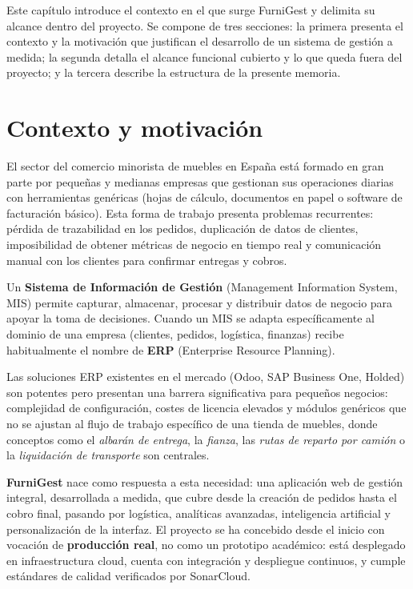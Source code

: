 \documentclass[12pt,twoside,titlepage]{report}
\begin{document}
Este capítulo introduce el contexto en el que surge FurniGest y delimita su alcance dentro del proyecto. Se compone de tres secciones: la primera presenta el contexto y la motivación que justifican el desarrollo de un sistema de gestión a medida; la segunda detalla el alcance funcional cubierto y lo que queda fuera del proyecto; y la tercera describe la estructura de la presente memoria.

\section{Contexto y motivación}

El sector del comercio minorista de muebles en España está formado en gran parte por pequeñas y medianas empresas que gestionan sus operaciones diarias con herramientas genéricas (hojas de cálculo, documentos en papel o software de facturación básico). Esta forma de trabajo presenta problemas recurrentes: pérdida de trazabilidad en los pedidos, duplicación de datos de clientes, imposibilidad de obtener métricas de negocio en tiempo real y comunicación manual con los clientes para confirmar entregas y cobros.

Un \textbf{Sistema de Información de Gestión} (Management Information System, MIS) \cite{pressman} permite capturar, almacenar, procesar y distribuir datos de negocio para apoyar la toma de decisiones. Cuando un MIS se adapta específicamente al dominio de una empresa (clientes, pedidos, logística, finanzas) recibe habitualmente el nombre de \textbf{ERP} (Enterprise Resource Planning).


Las soluciones ERP existentes en el mercado (Odoo, SAP Business One, Holded) son potentes pero presentan una barrera significativa para pequeños negocios: complejidad de configuración, costes de licencia elevados y módulos genéricos que no se ajustan al flujo de trabajo específico de una tienda de muebles, donde conceptos como el \emph{albarán de entrega}, la \emph{fianza}, las \emph{rutas de reparto por camión} o la \emph{liquidación de transporte} son centrales.

\textbf{FurniGest} nace como respuesta a esta necesidad: una aplicación web de gestión integral, desarrollada a medida, que cubre desde la creación de pedidos hasta el cobro final, pasando por logística, analíticas avanzadas, inteligencia artificial y personalización de la interfaz. El proyecto se ha concebido desde el inicio con vocación de \textbf{producción real}, no como un prototipo académico: está desplegado en infraestructura cloud, cuenta con integración y despliegue continuos, y cumple estándares de calidad verificados por SonarCloud.
\end{document}
